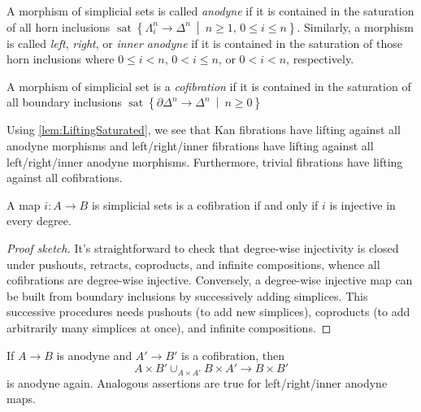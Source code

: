 \begin{defi}\label{def:Anodyne}
	\begin{alphanumerate}
		\item A morphism of simplicial sets is called \emph{anodyne} if it is contained in the saturation of all horn inclusions $\operatorname{sat}\left\{\Lambda_i^n\rightarrow\Delta^n\ \middle|\ n\geqslant 1,\,0\leqslant i\leqslant n\right\}$. Similarly, a morphism is called \emph{left}, \emph{right}, or \emph{inner anodyne} if it is contained in the saturation of those horn inclusions where $0\leqslant i<n$, $0<i\leqslant n$, or $0<i<n$, respectively.
		\item A morphism of simplicial set is a \emph{cofibration} if it is contained in the saturation of all boundary inclusions $\operatorname{sat}\left\{\partial\Delta^n\rightarrow\Delta^n\ \middle|\ n\geqslant 0\right\}$
	\end{alphanumerate}
\end{defi}
\begin{exm}
	Using \cref{lem:LiftingSaturated}, we see that Kan fibrations have lifting against all anodyne morphisms and left/right/inner fibrations have lifting against all left/right/inner anodyne morphisms. Furthermore, trivial fibrations have lifting against all cofibrations.
\end{exm}	
\begin{lem}\label{lem:Cofibration}
	A map $i\colon A\rightarrow B$ is simplicial sets is a cofibration if and only if $i$ is injective in every degree.
\end{lem}
\begin{proof}[Proof sketch]
	It's straightforward to check that degree-wise injectivity is closed under pushouts, retracts, coproducts, and infinite compositions, whence all cofibrations are degree-wise injective. Conversely, a degree-wise injective map can be built from boundary inclusions by successively adding simplices. This successive procedures needs pushouts (to add new simplices), coproducts (to add arbitrarily many simplices at once), and infinite compositions.
\end{proof}
\begin{lem}\label{lem:AnodynePushout}
	If $A\rightarrow B$ is anodyne and $A'\rightarrow B'$ is a cofibration, then
	\begin{equation*}
		A\times B'\cup_{A\times A'}B\times A'\longrightarrow B\times B'
	\end{equation*}
	is anodyne again. Analogous assertions are true for left/right/inner anodyne maps.
\end{lem}
